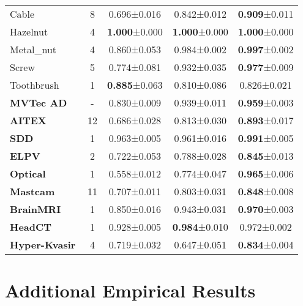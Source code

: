 \documentclass[10pt,twocolumn,letterpaper]{article}
\begin{document}
\begin{table}[bt]
{\begin{tabular}{l@{}|c|ccc}
    Cable &8 & 0.696\footnotesize{±0.016}& 0.842\footnotesize{±0.012}& \textbf{0.909}\footnotesize{±0.011} \\
    
    Hazelnut &4 & \textbf{1.000}\footnotesize{±0.000}& \textbf{1.000}\footnotesize{±0.000}& \textbf{1.000}\footnotesize{±0.000} \\
    
    Metal\_nut & 4 & 0.860\footnotesize{±0.053}& 0.984\footnotesize{±0.002}& \textbf{0.997}\footnotesize{±0.002} \\
    
    Screw & 5 & 0.774\footnotesize{±0.081}& 0.932\footnotesize{±0.035}& \textbf{0.977}\footnotesize{±0.009} \\
    
    Toothbrush & 1 & \textbf{0.885}\footnotesize{±0.063}& 0.810\footnotesize{±0.086}& 0.826\footnotesize{±0.021} \\
    
    \hline
    \textbf{MVTec AD} & - & 0.830\footnotesize{±0.009}& 0.939\footnotesize{±0.011}& \textbf{0.959}\footnotesize{±0.003} \\
    
    \textbf{AITEX } &12 & 0.686\footnotesize{±0.028}& 0.813\footnotesize{±0.030}& \textbf{0.893}\footnotesize{±0.017} \\
    
    \textbf{SDD}& 1 & 0.963\footnotesize{±0.005}& 0.961\footnotesize{±0.016}& \textbf{0.991}\footnotesize{±0.005} \\
    
    \textbf{ELPV} & 2 & 0.722\footnotesize{±0.053}& 0.788\footnotesize{±0.028}& \textbf{0.845}\footnotesize{±0.013} \\
    
   \textbf{Optical}& 1 & 0.558\footnotesize{±0.012}& 0.774\footnotesize{±0.047}& \textbf{0.965}\footnotesize{±0.006}\\
   
   \textbf{Mastcam}& 11 & 0.707\footnotesize{±0.011}& 0.803\footnotesize{±0.031}& \textbf{0.848}\footnotesize{±0.008}\\
   
    \textbf{BrainMRI}& 1 & 0.850\footnotesize{±0.016}& 0.943\footnotesize{±0.031}& \textbf{0.970}\footnotesize{±0.003}\\
    
   \textbf{HeadCT}& 1 & 0.928\footnotesize{±0.005}& \textbf{0.984}\footnotesize{±0.010}& 0.972\footnotesize{±0.002}\\
   
   \textbf{Hyper-Kvasir$\ $}& 4 & 0.719\footnotesize{±0.032}& 0.647\footnotesize{±0.051}& \textbf{0.834}\footnotesize{±0.004} \\
   \hline
    \end{tabular}
    }
  \label{tab:randomanomalies}\vspace{-0.3cm}
\end{table}\section{Additional Empirical Results}
\end{document}

